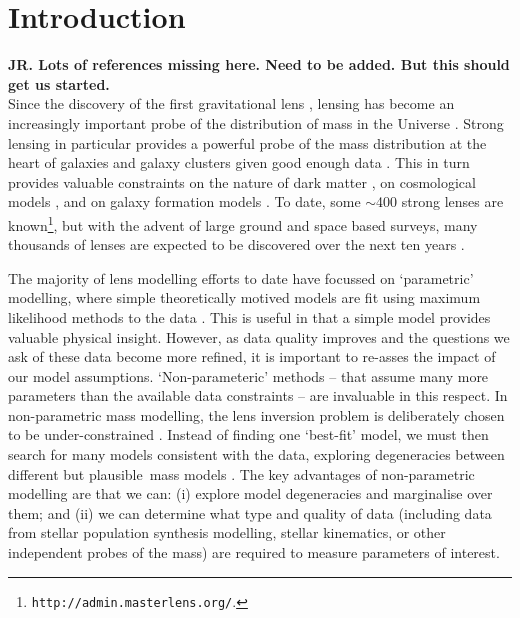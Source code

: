 \documentclass[galley,usenatbib]{mn2e}
\begin{document}
\section{Introduction}\label{sec:intro} %

{\bf JR. Lots of references missing here. Need to be added. But this should get us started.}\\

Since the discovery of the first gravitational lens
\citep{1979Natur.279..381W}, lensing has become an increasingly important probe
of the distribution of mass in the Universe
\citep{1937ApJ....86..217Z,2012arXiv1206.1225A}. Strong lensing in particular
provides a powerful probe of the mass distribution at the heart of galaxies and
galaxy clusters given good enough data
\citep{2010CQGra..27w3001B,2007ApJ...667..645R,2006ApJ...652L...5S,2009ApJ...690..154S}.
This in turn provides valuable constraints on the nature of dark matter
\citep{2006ApJ...652L...5S,2013ApJ...765...25N}, on cosmological models
\citep{2010Sci...329..924J, 2008ApJ...679...17C}, and on galaxy formation
models \citep{2012MNRAS.424..104L}. To date, some $\sim$400 strong lenses are
known\footnote{{\tt http://admin.masterlens.org/}.}, but with the advent of
large ground and space based surveys, many thousands of lenses are expected to
be discovered over the next ten years \citep{2012arXiv1206.1225A,
2010AAS...21540115M, 2004NewAR..48.1085K}.

The majority of lens modelling efforts to date have focussed on `parametric'
modelling, where simple theoretically motived models are fit using maximum
likelihood methods to the data \citep{2011A&ARv..19...47K, 1993A&A...273..367K,
2010GReGr..42.2151K}. This is useful in that a simple model provides valuable
physical insight. However, as data quality improves and the questions we ask of
these data become more refined, it is important to re-asses the impact of our
model assumptions. `Non-parameteric' methods -- that assume many more
parameters than the available data constraints -- are invaluable in this
respect. In non-parametric mass modelling, the lens inversion problem is
deliberately chosen to be under-constrained
\citep{1997MNRAS.292..148S,2005MNRAS.360..477D,2010ApJ...723.1678C,2006MNRAS.367.1209L,2013arXiv1304.2393S}.
Instead of finding one `best-fit' model, we must then search for many models
consistent with the data, exploring degeneracies between different but
plausible\footnotemark\ mass models
\citep{2000AJ....120.1654S,2006ApJ...653..936S,2008MNRAS.386..307L}. The key
advantages of non-parametric modelling are that we can: (i) explore model
degeneracies and marginalise over them; and (ii) we can determine what type and
quality of data (including data from stellar population synthesis modelling,
stellar kinematics, or other independent probes of the mass) are required to
measure parameters of interest. 
\end{document}
